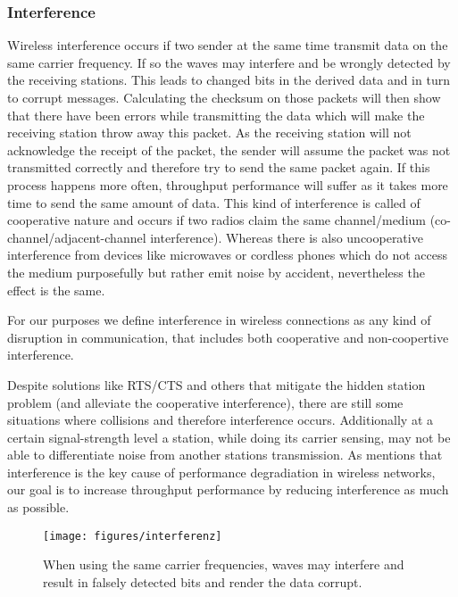       \subsubsection{Interference}
	Wireless interference occurs if two sender at the same time transmit data on the same carrier frequency. If so the waves may interfere and be wrongly detected
	by the receiving stations. This leads to changed bits in the derived data and in turn to corrupt messages. Calculating the checksum on those packets will then 
	show that there have been errors while transmitting the data which will make the receiving station throw away this packet.
	As the receiving station will not acknowledge the receipt of the packet, the sender will assume the packet was not transmitted correctly and therefore try 
	to send the same packet again. If this process happens more often, throughput performance will suffer as it takes more time to send the same amount of data.
	This kind of interference is called of cooperative nature and occurs if two radios claim the same channel/medium (co-channel/adjacent-channel interference).
	Whereas there is also uncooperative interference from devices like microwaves or cordless phones which do not access the medium purposefully but rather
	emit noise by accident, nevertheless the effect is the same.
	
	For our purposes we define interference in wireless connections as any kind of disruption in communication, that includes both cooperative and non-coopertive interference.
	
	Despite solutions like RTS/CTS and others that mitigate the hidden station problem (and alleviate the cooperative interference),
	there are still some situations where collisions and therefore interference occurs.
	Additionally at a certain signal-strength level a station, while doing its carrier sensing, may not be able to differentiate noise from another stations transmission.
	As \cite{padhye2005estimation} mentions that interference is the key cause of performance degradiation in wireless networks, our goal is to increase throughput 
	performance by reducing interference as much as possible.
	
	\begin{figure}[h!]
	  \centering
	  \texttt{[image: figures/interferenz]}
	  \caption{When using the same carrier frequencies, waves may interfere and result in falsely detected bits and render the data corrupt.}
	  \label{fig:interferenz}
	\end{figure}
	      
